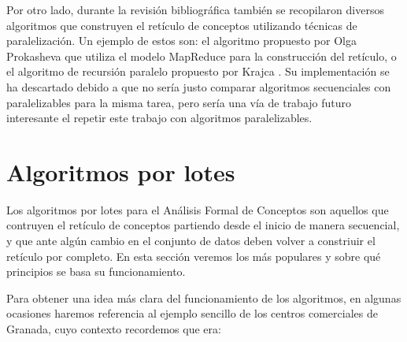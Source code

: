 \documentclass[oneside,openright,titlepage,numbers=noenddot,openany,headinclude,footinclude=true,
cleardoublepage=empty,abstractoff,BCOR=5mm,paper=a4,fontsize=12pt,main=spanish]{scrreprt}
\begin{document}
Por otro lado, durante la revisión bibliográfica también se recopilaron diversos algoritmos que construyen el retículo de conceptos utilizando técnicas de paralelización. Un ejemplo de estos son:  el algoritmo propuesto por Olga Prokasheva \cite{mapreduce} que utiliza el modelo MapReduce para la construcción del retículo, o el algoritmo de recursión paralelo propuesto por Krajca \cite{paralel}. Su implementación se ha descartado debido a que no sería justo comparar algoritmos secuenciales con paralelizables para la misma tarea, pero sería una vía de trabajo futuro interesante el repetir este trabajo con algoritmos paralelizables.

\section{Algoritmos por lotes}


Los algoritmos por lotes para el Análisis Formal de Conceptos son aquellos que contruyen el retículo de conceptos partiendo desde el inicio de manera secuencial, y que ante algún cambio en el conjunto de datos deben volver a constriuir el retículo por completo. En esta sección veremos los más populares y sobre qué principios se basa su funcionamiento.

Para obtener una idea más clara del funcionamiento de los algoritmos, en algunas ocasiones haremos referencia al ejemplo sencillo de los centros comerciales de Granada, cuyo contexto recordemos que era:

\begin{table}[H]
\centering
{}
\caption{Tabla cruzada para un contexto de centros comerciales de Granada.}
\label{tab:comcercialesal}
\end{table}
\end{document}
